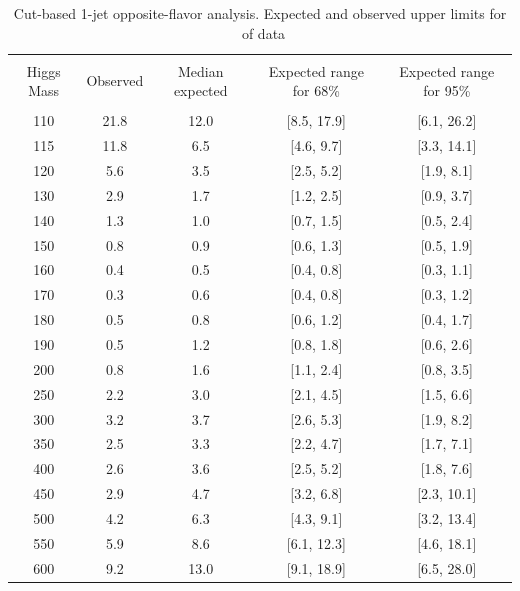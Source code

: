 \begin{table}[!hbp]
\begin{center}
\begin{tabular}{c c c c c}
\hline
\vspace{-3mm} && \\
 Higgs Mass   & Observed & Median expected & Expected range for 68\% & Expected range for 95\%   \\
\vspace{-3mm} && \\
\hline
110 & 21.8 & 12.0 & [8.5, 17.9] & [6.1, 26.2] \\
115 & 11.8 & 6.5 & [4.6, 9.7] & [3.3, 14.1] \\
120 & 5.6 & 3.5 & [2.5, 5.2] & [1.9, 8.1] \\
130 & 2.9 & 1.7 & [1.2, 2.5] & [0.9, 3.7] \\
140 & 1.3 & 1.0 & [0.7, 1.5] & [0.5, 2.4] \\
150 & 0.8 & 0.9 & [0.6, 1.3] & [0.5, 1.9] \\
160 & 0.4 & 0.5 & [0.4, 0.8] & [0.3, 1.1] \\
170 & 0.3 & 0.6 & [0.4, 0.8] & [0.3, 1.2] \\
180 & 0.5 & 0.8 & [0.6, 1.2] & [0.4, 1.7] \\
190 & 0.5 & 1.2 & [0.8, 1.8] & [0.6, 2.6] \\
200 & 0.8 & 1.6 & [1.1, 2.4] & [0.8, 3.5] \\
250 & 2.2 & 3.0 & [2.1, 4.5] & [1.5, 6.6] \\
300 & 3.2 & 3.7 & [2.6, 5.3] & [1.9, 8.2] \\
350 & 2.5 & 3.3 & [2.2, 4.7] & [1.7, 7.1] \\
400 & 2.6 & 3.6 & [2.5, 5.2] & [1.8, 7.6] \\
450 & 2.9 & 4.7 & [3.2, 6.8] & [2.3, 10.1] \\
500 & 4.2 & 6.3 & [4.3, 9.1] & [3.2, 13.4] \\
550 & 5.9 & 8.6 & [6.1, 12.3] & [4.6, 18.1] \\
600 & 9.2 & 13.0 & [9.1, 18.9] & [6.5, 28.0] \\
\hline
\end{tabular}
\caption{Cut-based 1-jet opposite-flavor analysis. Expected and observed
  upper limits for \intlumi\ of data}
\label{tab:of1_cut}
\end{center}
\end{table}

